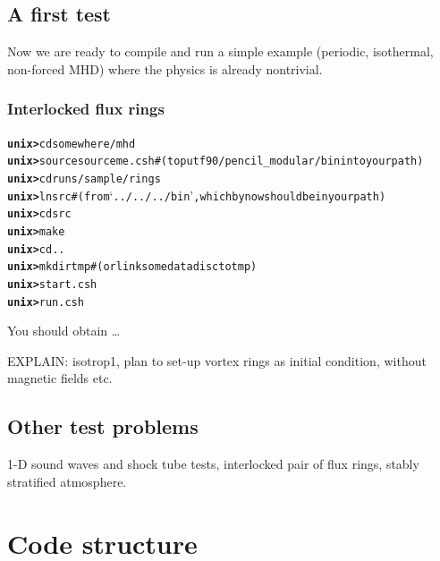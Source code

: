 \documentclass[12pt,twoside,notitlepage,a4paper]{article}
\newcommand{\prompt}[1]{{\ttfamily\bfseries{}#1}}
\newcommand{\file}[1]{`\texttt{#1}'}
\begin{document}

\subsection{A first test}

Now we are ready to compile and run a simple example (periodic,
isothermal, non-forced MHD) where the physics is already nontrivial.


\subsubsection{Interlocked flux rings}

\begin{alltt}
  \prompt{unix> } cd somewhere/mhd
  \prompt{unix> } source sourceme.csh \quad\#(to put f90/pencil_modular/bin into your path)
  \prompt{unix> } cd runs/sample/rings
  \prompt{unix> } lnsrc \quad\#(from \file{../../../bin}, which by now should be in your path)
  \prompt{unix> } cd src
  \prompt{unix> } make
  \prompt{unix> } cd ..
  \prompt{unix> } mkdir tmp \quad\#(or link some data disc to tmp)
  \prompt{unix> } start.csh
  \prompt{unix> } run.csh
\end{alltt}

You should obtain \ldots

\vspace{5cm}

EXPLAIN: isotrop1, plan to set-up vortex rings as initial condition,
without magnetic fields etc.


\subsection{Other test problems}

1-D sound waves and shock tube tests, interlocked pair of flux rings, stably stratified atmosphere.



\section{Code structure}

\end{document}
